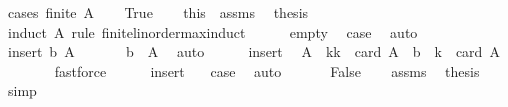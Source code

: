 \begin{isabellebody}
%
\isadelimproof
%
\endisadelimproof
%
\isatagproof
{}\isamarkupfalse%
\ {\isacharparenleft}{\kern0pt}cases\ {\isachardoublequoteopen}finite\ A{\isachardoublequoteclose}{\isacharparenright}{\kern0pt}\isanewline
\ \ \isamarkupfalse%
\ True\isanewline
\ \ \isamarkupfalse%
\ this\ \ assms\ \isamarkupfalse%
\ {\isacharquery}{\kern0pt}thesis\isanewline
\ \ \isamarkupfalse%
\ {\isacharparenleft}{\kern0pt}induct\ A\ rule{\isacharcolon}{\kern0pt}\ finite{\isacharunderscore}{\kern0pt}linorder{\isacharunderscore}{\kern0pt}max{\isacharunderscore}{\kern0pt}induct{\isacharparenright}{\kern0pt}\isanewline
\ \ \ \ \isamarkupfalse%
\ empty\ \isamarkupfalse%
\ {\isacharquery}{\kern0pt}case\ \isamarkupfalse%
\ auto\isanewline
\ \ \isamarkupfalse%
\isanewline
\ \ \ \ \isamarkupfalse%
\ {\isacharparenleft}{\kern0pt}insert\ b\ A{\isacharparenright}{\kern0pt}\isanewline
\ \ \ \ \isamarkupfalse%
\ {\isacharasterisk}{\kern0pt}{\isacharcolon}{\kern0pt}\ {\isachardoublequoteopen}b\ {\isasymnotin}\ A{\isachardoublequoteclose}\ \isamarkupfalse%
\ auto\isanewline
\ \ \ \ \isamarkupfalse%
\ insert\ \isamarkupfalse%
\ {\isachardoublequoteopen}A\ {\isasymle}\ {\isacharbraceleft}{\kern0pt}k{\isachardot}{\kern0pt}{\isachardot}{\kern0pt}{\isacharless}{\kern0pt}k\ {\isacharplus}{\kern0pt}\ card\ A{\isacharbraceright}{\kern0pt}{\isachardoublequoteclose}\ \ {\isachardoublequoteopen}b\ {\isacharequal}{\kern0pt}\ k\ {\isacharplus}{\kern0pt}\ card\ A{\isachardoublequoteclose}\isanewline
\ \ \ \ \ \ \isamarkupfalse%
\ fastforce{\isacharplus}{\kern0pt}\isanewline
\ \ \ \ \isamarkupfalse%
\ insert\ {\isacharasterisk}{\kern0pt}\ \isamarkupfalse%
\ {\isacharquery}{\kern0pt}case\ \isamarkupfalse%
\ auto\isanewline
\ \ \isamarkupfalse%
\isanewline
{}\isamarkupfalse%
\isanewline
\ \ \isamarkupfalse%
\ False\isanewline
\ \ \isamarkupfalse%
\ assms\ \isamarkupfalse%
\ {\isacharquery}{\kern0pt}thesis\ \isamarkupfalse%
\ simp\isanewline
{}\isamarkupfalse%
%
\endisatagproof
{\isafoldproof}%
%
\isadelimproof
%
\endisadelimproof
%
\isadelimdocument
%
\endisadelimdocument
%
\isatagdocument
%
\isamarkuptrue%

\end{isabellebody}
